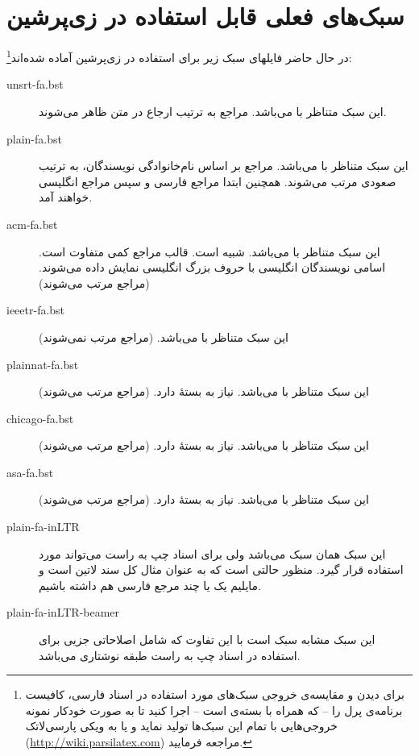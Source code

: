 \documentclass[a4paper]{article}
\theoremstyle{plain}\newtheorem{question}{پرسش}
\begin{document}
\section{سبک‌های فعلی قابل استفاده در زی‌پرشین}
در حال حاضر فایلهای سبک زیر برای استفاده در زی‌پرشین آماده شده‌اند\footnote{برای دیدن و مقایسه‌ی خروجی  سبک‌های مورد استفاده در اسناد فارسی، کافیست برنامه‌ی پرل  را -- که همراه با بسته‌ی  است -- اجرا کنید تا به صورت خودکار نمونه خروجی‌هایی با تمام این سبک‌ها تولید نماید و یا به ویکی پارسی‌لاتک
 (\url{http://wiki.parsilatex.com})
    مراجعه فرمایید.}:
\begin{description}
\item [unsrt-fa.bst] این سبک متناظر با  می‌باشد. مراجع به ترتیب ارجاع در متن ظاهر می‌شوند.
\item [plain-fa.bst] این سبک متناظر با  می‌باشد. مراجع بر اساس نام‌خانوادگی نویسندگان، به ترتیب صعودی مرتب می‌شوند.
 همچنین ابتدا مراجع فارسی و سپس مراجع انگلیسی خواهند آمد.
\item [acm-fa.bst] این سبک متناظر با  می‌باشد. شبیه  است.  قالب مراجع کمی متفاوت است. اسامی نویسندگان انگلیسی با حروف بزرگ انگلیسی نمایش داده می‌شوند. (مراجع مرتب می‌شوند)
\item [ieeetr-fa.bst] این سبک متناظر با  می‌باشد. (مراجع مرتب نمی‌شوند)
\item [plainnat-fa.bst] این سبک متناظر با  می‌باشد. نیاز به بستهٔ  دارد. (مراجع مرتب می‌شوند)
\item [chicago-fa.bst] این سبک متناظر با  می‌باشد. نیاز به بستهٔ  دارد. (مراجع مرتب می‌شوند)
\item [asa-fa.bst] این سبک متناظر با  می‌باشد. نیاز به بستهٔ  دارد. (مراجع مرتب می‌شوند)
\item[plain-fa-inLTR]
این سبک همان سبک 
می‌باشد ولی برای اسناد چپ به راست می‌تواند مورد استفاده قرار گیرد. منظور حالتی است که به عنوان مثال کل سند لاتین است و مایلیم یک یا چند مرجع فارسی هم داشته باشیم.
\item[plain-fa-inLTR-beamer]
این سبک مشابه سبک 
است با این تفاوت که شامل اصلاحاتی جزیی برای استفاده در اسناد چپ به راست طبقه نوشتاری
می‌باشد.
\end{description}
\end{document}
